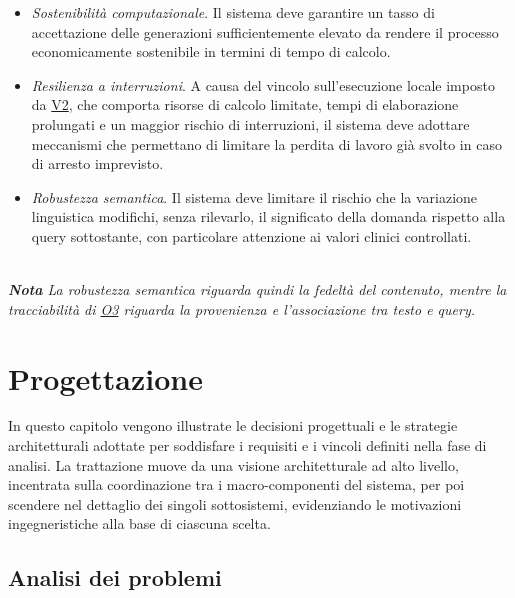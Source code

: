 \documentclass[12pt,a4paper,openright,twoside]{book}
\begin{document}
\begin{itemize}
    \item[\textbf{RNF1}]\label{rnf:RNF1} \textit{Sostenibilità computazionale}.
          Il sistema deve garantire un tasso di accettazione delle generazioni
          sufficientemente elevato da rendere il processo economicamente
          sostenibile in termini di tempo di calcolo.

    \item[\textbf{RNF2}]\label{rnf:RNF2} \textit{Resilienza a interruzioni}. A
          causa del vincolo sull'esecuzione locale imposto da
          \hyperref[vinc:V2]{V2}, che comporta risorse di calcolo limitate,
          tempi di elaborazione prolungati e un maggior rischio di interruzioni,
          il sistema deve adottare meccanismi che permettano di limitare la
          perdita di lavoro già svolto in caso di arresto imprevisto.

    \item[\textbf{RNF3}]\label{rnf:RNF3} \textit{Robustezza semantica}. Il
          sistema deve limitare il rischio che la variazione linguistica
          modifichi, senza rilevarlo, il significato della domanda rispetto alla
          query sottostante, con particolare attenzione ai valori clinici
          controllati.
\end{itemize}

\textit{\\\textbf{Nota}
    La robustezza semantica riguarda quindi la fedeltà del contenuto, mentre la
    tracciabilità di \hyperref[obj:O3]{O3} riguarda la provenienza e
    l'associazione tra testo e query.}

\chapter{Progettazione}
\label{chap:progettazione}

In questo capitolo vengono illustrate le decisioni progettuali e le strategie
architetturali adottate per soddisfare i requisiti e i vincoli definiti nella
fase di analisi. La trattazione muove da una visione architetturale ad alto
livello, incentrata sulla coordinazione tra i macro-componenti del sistema, per
poi scendere nel dettaglio dei singoli sottosistemi, evidenziando le motivazioni
ingegneristiche alla base di ciascuna scelta.

\section{Analisi dei problemi}
\end{document}
